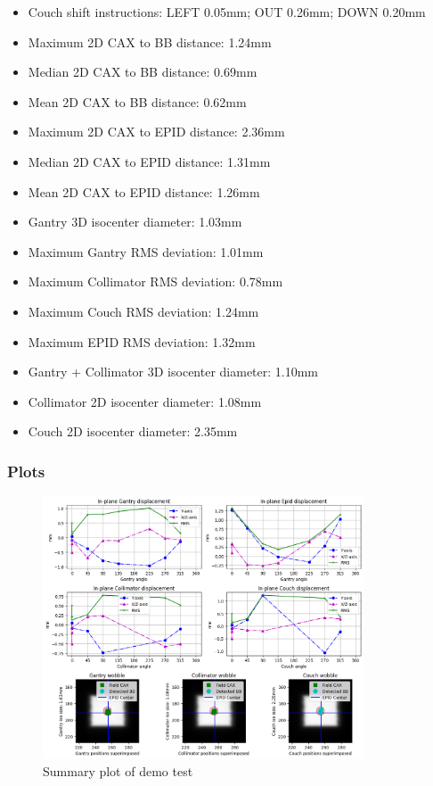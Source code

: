 \begin{multicols}{2}
\begin{itemize}

    \item Couch shift instructions: LEFT 0.05mm; OUT 0.26mm; DOWN 0.20mm
    \item Maximum 2D CAX to BB distance: 1.24mm
    \item Median 2D CAX to BB distance: 0.69mm
    \item Mean 2D CAX to BB distance: 0.62mm
    \item Maximum 2D CAX to EPID distance: 2.36mm
    \item Median 2D CAX to EPID distance: 1.31mm
    \item Mean 2D CAX to EPID distance: 1.26mm
    \item Gantry 3D isocenter diameter: 1.03mm
    \item Maximum Gantry RMS deviation: 1.01mm
    \item Maximum Collimator RMS deviation: 0.78mm
    \item Maximum Couch RMS deviation: 1.24mm
    \item Maximum EPID RMS deviation: 1.32mm
    \item Gantry + Collimator 3D isocenter diameter: 1.10mm
    \item Collimator 2D isocenter diameter: 1.08mm
    \item Couch 2D isocenter diameter: 2.35mm
    
\end{itemize}
\end{multicols}

\subsubsection{Plots}

\begin{figure}[H]
    \centering
    \includegraphics[width=0.85\textwidth]{Content/Images/analysis_wl_demo_summary_plot.png}
    \caption{Summary plot of demo test}
\end{figure}

